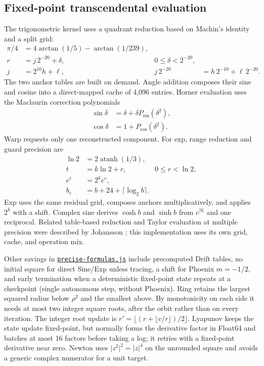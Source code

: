 \documentclass[11pt,a4paper]{article}
\numberwithin{equation}{section}
\newcommand{\abs}[1]{\lvert#1\rvert}
\newcommand{\code}[1]{\texttt{#1}}
\begin{document}
\subsection{Fixed-point transcendental evaluation}

The trigonometric kernel uses a quadrant reduction based on Machin's
identity and a split grid:
\begin{align}
  \pi/4&=4\arctan(1/5)-\arctan(1/239),\\
  r&=j\,2^{-20}+\delta,
       &0\le\delta<2^{-20},\\
  j&=2^{10}h+\ell,
       &j\,2^{-20}&=h\,2^{-10}+\ell\,2^{-20}.
\end{align}
The two anchor tables are built on demand. Angle addition composes
their sine and cosine into a direct-mapped cache of 4,096 entries.
Horner evaluation uses the Maclaurin correction polynomials
\begin{align}
  \sin\delta&=\delta+\delta P_{\sin}(\delta^2),\\
  \cos\delta&=1+P_{\cos}(\delta^2).
\end{align}
Warp requests only one reconstructed component. For exp, range
reduction and guard precision are
\begin{align}
  \ln 2&=2\operatorname{atanh}(1/3),\\
  t&=k\ln 2+r, &0\le r<\ln2,\\
  e^t&=2^k e^r,\\
  b_e&=b+24+\lceil\log_2 b\rceil .
\end{align}
Exp uses the same residual grid, composes anchors multiplicatively,
and applies \(2^k\) with a shift. Complex sine derives \(\cosh b\)
and \(\sinh b\) from \(e^{\abs b}\) and one reciprocal. Related
table-based reduction and Taylor evaluation at multiple precision
were described by Johansson \cite{johansson}; this implementation
uses its own grid, cache, and operation mix.

Other savings in \href{../dist/precise-formulas.js}{\code{precise-formulas.js}}
include precomputed Drift tables, no initial square for direct
Sine/Exp unless tracing, a shift for Phoenix \(m=-1/2\), and early
termination when a deterministic fixed-point state repeats at a
checkpoint (single autonomous step, without Phoenix). Ring retains
the largest squared radius below \(\rho^2\) and the smallest above.
By monotonicity on each side it needs at most two integer square roots,
after the orbit rather than on every iteration. The integer root
update is \(r'\!=\lfloor(r+\lfloor v/r\rfloor)/2\rfloor\).
Lyapunov keeps the state update fixed-point, but normally forms the
derivative factor in Float64 and batches at most 16 factors before
taking a log; it retries with a fixed-point derivative near zero.
Newton uses \(\abs{z^2}^2=\abs z^4\) on the unrounded square and
avoids a generic complex numerator for a unit target.
\end{document}
